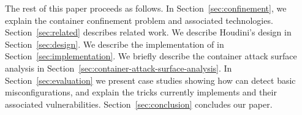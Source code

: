 The rest of this paper proceeds as follows. In Section~\ref{sec:confinement}, we explain the container confinement problem and associated technologies. Section~\ref{sec:related} describes related work. We describe Houdini's design in Section~\ref{sec:design}. We describe the implementation of \houdini in Section~\ref{sec:implementation}. We briefly describe the container attack surface analysis in Section~\ref{sec:container-attack-surface-analysis}. In Section~\ref{sec:evaluation} we present case studies showing how \houdini can detect basic misconfigurations, and explain the tricks \houdini currently implements and their associated vulnerabilities. Section~\ref{sec:conclusion} concludes our paper.






